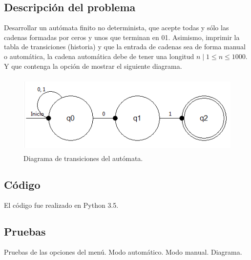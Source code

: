 \documentclass[12pt, titlepage]{article}
\begin{document}
	\subsection{Descripción del problema}
	Desarrollar un autómata finito no determinista, que acepte todas y sólo las cadenas formadas por ceros y unos que terminan en 01. Asimismo, imprimir la tabla de transiciones (historia) y que la entrada de cadenas sea de forma manual o automática, la cadena automática debe de tener una longitud $n \mid 1  \leq n \leq 1000$. Y que contenga la opción de mostrar el siguiente diagrama.
	\begin{figure}[ht]
		\begin{center}
			\includegraphics[width=12cm, height=4cm]{img/cero-uno.png}
			\caption{Diagrama de transiciones del autómata. \cite{LIBRO}}
			\label{fig:diagrama4}
		\end{center}
	\end{figure}
	
	\subsection{Código}
	El código fue realizado en Python 3.5.
	\subsection{Pruebas}
	Pruebas de las opciones del menú.
	{\large Modo automático.}
	{\large Modo manual.}
	{\large Diagrama.}
	
	 
	
\end{document}
